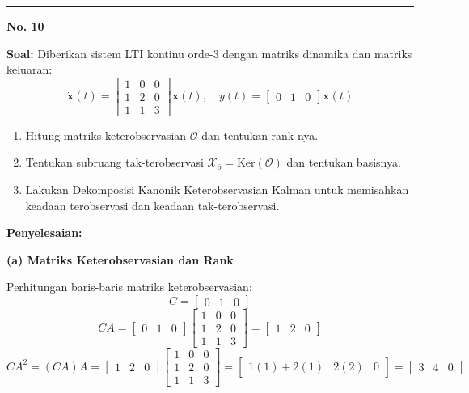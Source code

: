 \documentclass[11pt,a4paper]{article}
\begin{document}
\vspace{12pt}
\hrule
\vspace{10pt}

\textbf{\large No. 10}

\textbf{Soal:}  
Diberikan sistem LTI kontinu orde-3 dengan matriks dinamika dan matriks keluaran:
$$\dot{\mathbf{x}}(t) = \begin{bmatrix} 1 & 0 & 0 \\ 1 & 2 & 0 \\ 1 & 1 & 3 \end{bmatrix} \mathbf{x}(t), \quad y(t) = \begin{bmatrix} 0 & 1 & 0 \end{bmatrix} \mathbf{x}(t)$$
\begin{enumerate}[label=(\alph*)]
    \item Hitung matriks keterobservasian $\mathcal{O}$ dan tentukan rank-nya.
    \item Tentukan subruang tak-terobservasi $\mathcal{X}_{\bar{o}} = \text{Ker}(\mathcal{O})$ dan tentukan basisnya.
    \item Lakukan Dekomposisi Kanonik Keterobservasian Kalman untuk memisahkan keadaan terobservasi dan keadaan tak-terobservasi.
\end{enumerate}

\textbf{Penyelesaian:}

\textbf{(a) Matriks Keterobservasian dan Rank}

Perhitungan baris-baris matriks keterobservasian:
$$C = \begin{bmatrix} 0 & 1 & 0 \end{bmatrix}$$
$$CA = \begin{bmatrix} 0 & 1 & 0 \end{bmatrix} \begin{bmatrix} 1 & 0 & 0 \\ 1 & 2 & 0 \\ 1 & 1 & 3 \end{bmatrix} = \begin{bmatrix} 1 & 2 & 0 \end{bmatrix}$$
$$CA^2 = (CA)A = \begin{bmatrix} 1 & 2 & 0 \end{bmatrix} \begin{bmatrix} 1 & 0 & 0 \\ 1 & 2 & 0 \\ 1 & 1 & 3 \end{bmatrix} = \begin{bmatrix} 1(1) + 2(1) & 2(2) & 0 \end{bmatrix} = \begin{bmatrix} 3 & 4 & 0 \end{bmatrix}$$
\end{document}
